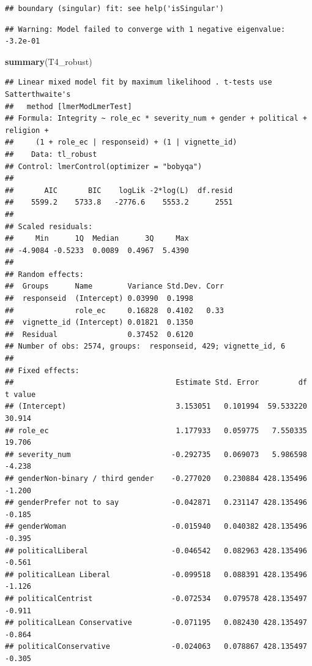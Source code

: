 \documentclass[
]{article}
\newenvironment{Shaded}{\begin{snugshade}}{\end{snugshade}}
\newcommand{\FunctionTok}[1]{\textcolor[rgb]{0.13,0.29,0.53}{\textbf{#1}}}
\newcommand{\NormalTok}[1]{#1}
\begin{document}
\begin{verbatim}
## boundary (singular) fit: see help('isSingular')
\end{verbatim}

\begin{verbatim}
## Warning: Model failed to converge with 1 negative eigenvalue: -3.2e-01
\end{verbatim}

\begin{Shaded}
\begin{Highlighting}[]
\FunctionTok{summary}\NormalTok{(T4\_robust)}
\end{Highlighting}
\end{Shaded}

\begin{verbatim}
## Linear mixed model fit by maximum likelihood . t-tests use Satterthwaite's
##   method [lmerModLmerTest]
## Formula: Integrity ~ role_ec * severity_num + gender + political + religion +  
##     (1 + role_ec | responseid) + (1 | vignette_id)
##    Data: tl_robust
## Control: lmerControl(optimizer = "bobyqa")
## 
##       AIC       BIC    logLik -2*log(L)  df.resid 
##    5599.2    5733.8   -2776.6    5553.2      2551 
## 
## Scaled residuals: 
##     Min      1Q  Median      3Q     Max 
## -4.9084 -0.5233  0.0089  0.4967  5.4390 
## 
## Random effects:
##  Groups      Name        Variance Std.Dev. Corr
##  responseid  (Intercept) 0.03990  0.1998       
##              role_ec     0.16828  0.4102   0.33
##  vignette_id (Intercept) 0.01821  0.1350       
##  Residual                0.37452  0.6120       
## Number of obs: 2574, groups:  responseid, 429; vignette_id, 6
## 
## Fixed effects:
##                                     Estimate Std. Error         df t value
## (Intercept)                         3.153051   0.101994  59.533220  30.914
## role_ec                             1.177933   0.059775   7.550335  19.706
## severity_num                       -0.292735   0.069073   5.986598  -4.238
## genderNon-binary / third gender    -0.277020   0.230884 428.135496  -1.200
## genderPrefer not to say            -0.042871   0.231147 428.135496  -0.185
## genderWoman                        -0.015940   0.040382 428.135496  -0.395
## politicalLiberal                   -0.046542   0.082963 428.135496  -0.561
## politicalLean Liberal              -0.099518   0.088391 428.135496  -1.126
## politicalCentrist                  -0.072534   0.079578 428.135497  -0.911
## politicalLean Conservative         -0.071195   0.082430 428.135497  -0.864
## politicalConservative              -0.024063   0.078867 428.135497  -0.305

\end{verbatim}
\end{document}
